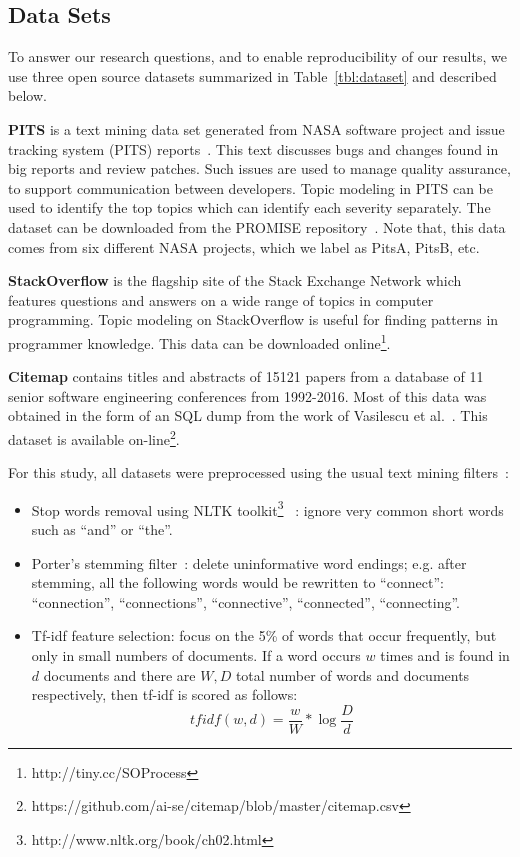 \documentclass[twocolumn,5p,sort&compress]{elsarticle}
\newcommand{\bi}{\begin{itemize}}
\newcommand{\ei}{\end{itemize}}
\theoremstyle{break}
\begin{document}
\subsection{Data Sets}
To answer our research questions, and to enable reproducibility of our results,
we use three open source datasets summarized in Table~\ref{tbl:dataset} and described
below.

\textbf{PITS} is a text mining data set generated from NASA software project
and issue tracking system (PITS) reports~\cite{menzies2008improving, menzies2008automated}. This text discusses
bugs and changes found in big reports and  review patches.
Such issues are used
to manage quality assurance, to support communication
between developers. Topic modeling in PITS can be used
to identify the top topics which can
identify each severity separately. The dataset can be downloaded from the
PROMISE
repository~\cite{promiserepo}. Note that, this data comes from six different
NASA projects, which we label as PitsA, PitsB, etc.
    
 \textbf{StackOverflow} is the flagship site of the Stack Exchange Network which
 features questions and answers on a wide range of topics in computer
 programming.
Topic modeling on StackOverflow is useful for finding patterns in programmer knowledge.
 This data can be downloaded online\footnote{http://tiny.cc/SOProcess}. 
    
  \textbf{Citemap} contains titles and abstracts of 15121 papers from a
 database of 11 senior software engineering conferences from 1992-2016. Most of this data was
 obtained in the form of an SQL dump from the work of Vasilescu et
 al.~\cite{vasilescu2013historical}.  This dataset is available on-line\footnote{https://github.com/ai-se/citemap/blob/master/citemap.csv}.

  For this study, all  datasets were preprocessed using the usual text mining filters~\cite{feldman2006j}:
\bi
\item
  Stop words removal using NLTK toolkit\footnote{http://www.nltk.org/book/ch02.html}~\cite{bird2006nltk} : ignore very common short words such as  ``and'' or ``the''.
\item
  Porter's stemming filter~\cite{Porter1980}: delete uninformative word endings; e.g. after stemming, all the following words would be rewritten
  to ``connect'': ``connection'', ``connections'',
``connective'',          
``connected'',
  ``connecting''.
\item
  Tf-idf feature selection: focus on the 5\% of words that occur frequently,
  but only in small numbers of documents. If a word occurs $w$ times
  and is found in $d$ documents  and there
  are $W,D$ total number of words and documents respectively, then tf-idf is scored
  as follows:
  \[
  \mathit{tfidf}(w,d)=   \frac{w}{W} *\log{\frac{D}{d}}\]
  \ei
\end{document}
